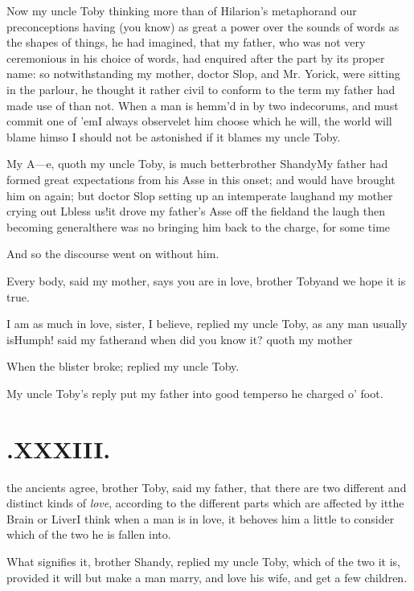 \documentclass{article}
\begin{document}
Now my uncle Toby thinking more 
than of Hilarion’s metaphor\tsk and our preconceptions having (you know) as great a
power over the sounds of words as the shapes of things, he had imagined, that my
father, who was not very ceremonious in his choice of words, had enquired after the
part by its proper name: so notwithstanding my mother, doctor Slop, and Mr.\@
Yorick, were sitting in the parlour, he thought it rather civil to conform to the
term my father had made use of than not. When a man is hemm’d in by two indecorums,
and must commit one of ’em\tsk I always observe\tsk\break let him choose which he will, the
world will blame him\tsk so I should not be
asto\-nished if it blames my uncle Toby.

My A—e, quoth my uncle Toby, is much
better\tsk brother Shandy\tsk My father had formed great
expectations from his Asse in this onset; and would have brought
him on again; but doctor Slop setting up an intemperate
laugh\tsk and my mother crying out L\tsk bless us!\tsk it
drove my father’s Asse off the field\tsk and the laugh then
becoming general\tsk there was no bringing him back to the
charge, for some time\tsh{}

And so the discourse went on without him.

Every body, said my mother, says\break
you are in love, brother Toby\tsk and we\break
hope it is true.

I am as much in love, sister, I believe, replied my uncle
Toby, as any man usually is\tsk Humph! said my
father\tsk\break and when did you know it? quoth my
mother\tsh

\tsh When the blister broke; replied my uncle
Toby.

My uncle Toby’s reply put my father into good
temper\tsk so he charged o’ foot.

\vfill{}\eject\null
\section{.\enspace XXXIII.}

 the ancients agree, brother Toby, said my father, that there are two
different and distinct kinds of \textit{love}, according to the different parts
which are affected by it\tsk the Brain or Liver\tsh I think when a man is in love, it
behoves him a little to consider which of the two he is fallen into.

What signifies it, brother Shandy, replied my uncle
Toby, which of the two it is, provided it will
but make a man marry, and love his wife, and get
a few children.
\end{document}
